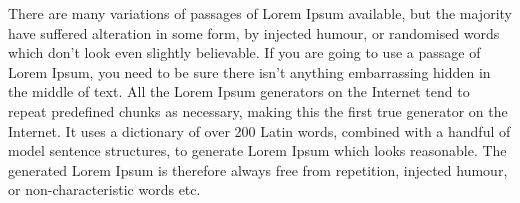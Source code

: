 \documentclass{ximera}
\begin{document}
\begin{center}
\end{center}

There are many variations of passages of Lorem Ipsum available, but
the majority have suffered alteration in some form, by injected
humour, or randomised words which don't look even slightly
believable. If you are going to use a passage of Lorem Ipsum, you need
to be sure there isn't anything embarrassing hidden in the middle of
text. All the Lorem Ipsum generators on the Internet tend to repeat
predefined chunks as necessary, making this the first true generator
on the Internet. It uses a dictionary of over 200 Latin words,
combined with a handful of model sentence structures, to generate
Lorem Ipsum which looks reasonable. The generated Lorem Ipsum is
therefore always free from repetition, injected humour, or
non-characteristic words etc.
\end{document}
